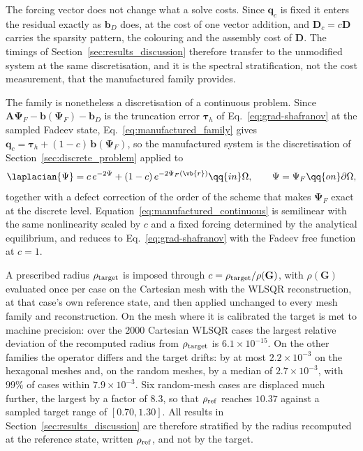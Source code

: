 The forcing vector does not change what a solve costs. Since $\mathbf{q}_c$ is fixed it enters the residual exactly as $\mathbf{b}_D$ does, at the cost of one vector addition, and $\mathbf{D}_c=c\mathbf{D}$ carries the sparsity pattern, the colouring and the assembly cost of $\mathbf{D}$. The timings of Section~\ref{sec:results_discussion} therefore transfer to the unmodified system at the same discretisation, and it is the spectral stratification, not the cost measurement, that the manufactured family provides.

The family is nonetheless a discretisation of a continuous problem. Since $\mathbf{A}\bm{\Psi}_F-\mathbf{b}(\bm{\Psi}_F)-\mathbf{b}_D$ is the truncation error $\bm{\tau}_h$ of Eq.~\eqref{eq:grad-shafranov} at the sampled Fadeev state, Eq.~\eqref{eq:manufactured_family} gives $\mathbf{q}_c=\bm{\tau}_h+(1-c)\,\mathbf{b}(\bm{\Psi}_F)$, so the manufactured system is the discretisation of Section~\ref{sec:discrete_problem} applied to
\begin{equation}
\laplacian{\Psi}=c\,e^{-2\Psi}+(1-c)\,e^{-2\Psi_F(\vb{r})} \qq{in} \Omega,
\qquad
\Psi=\Psi_F \qq{on} \partial\Omega,
\label{eq:manufactured_continuous}
\end{equation}
together with a defect correction of the order of the scheme that makes $\bm{\Psi}_F$ exact at the discrete level. Equation~\eqref{eq:manufactured_continuous} is semilinear with the same nonlinearity scaled by $c$ and a fixed forcing determined by the analytical equilibrium, and reduces to Eq.~\eqref{eq:grad-shafranov} with the Fadeev free function at $c=1$.

A prescribed radius $\rho_{\rm target}$ is imposed through $c=\rho_{\rm target}/\rho(\mathbf{G})$, with $\rho(\mathbf{G})$ evaluated once per case on the Cartesian mesh with the WLSQR reconstruction, at that case's own reference state, and then applied unchanged to every mesh family and reconstruction. On the mesh where it is calibrated the target is met to machine precision: over the $2000$ Cartesian WLSQR cases the largest relative deviation of the recomputed radius from $\rho_{\rm target}$ is $6.1\times10^{-15}$. On the other families the operator differs and the target drifts: by at most $2.2\times10^{-3}$ on the hexagonal meshes and, on the random meshes, by a median of $2.7\times10^{-3}$, with $99\%$ of cases within $7.9\times10^{-3}$. Six random-mesh cases are displaced much further, the largest by a factor of $8.3$, so that $\rho_{\rm ref}$ reaches $10.37$ against a sampled target range of $[0.70,1.30]$. All results in Section~\ref{sec:results_discussion} are therefore stratified by the radius recomputed at the reference state, written $\rho_{\rm ref}$, and not by the target.

